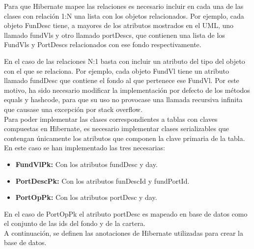 \documentclass[12pt, a4paper]{article}
\begin{document}
Para que Hibernate mapee las relaciones es necesario incluir en cada una de las clases con relación 1:N una lista con los objetos relacionados. Por ejemplo, cada objeto FunDesc tiene, a mayores de los atributos mostrados en el \gls{UML}, uno llamado fundVls y otro llamado portDescs, que contienen una lista de los FundVls y PortDescs relacionados con ese fondo respectivamente.\\

\newpage

En el caso de las relaciones N:1 basta con incluir un atributo del tipo del objeto con el que se relaciona. Por ejemplo, cada objeto FundVl tiene un atributo llamado fundDesc que contiene el fondo al que pertenece ese FundVl. Por este motivo, ha sido necesario modificar la implementación por defecto de los métodos equals y hashcode, para que su uso no provocase una llamada recursiva infinita que causase una excepción por stack overflow.\\


Para poder implementar las clases correspondientes a tablas con claves compuestas en Hibernate, es necesario implementar clases serializables que contengan únicamente los atributos que componen la clave primaria de la tabla. En este caso se han implementado las tres necesarias: %

\begin{itemize}
	\item \textbf{FundVlPk:} Con los atributos fundDesc y day.
	\item \textbf{PortDescPk:} Con los atributos funDescId y fundPortId.
	\item \textbf{PortOpPk:} Con los atributos portDesc y day.
\end{itemize}

En el caso de PortOpPk el atributo portDesc es mapeado en base de datos como el conjunto de las ids del fondo y de la cartera.\\

A continuación, se definen las anotaciones de Hibernate utilizadas para crear la base de datos.
\end{document}
